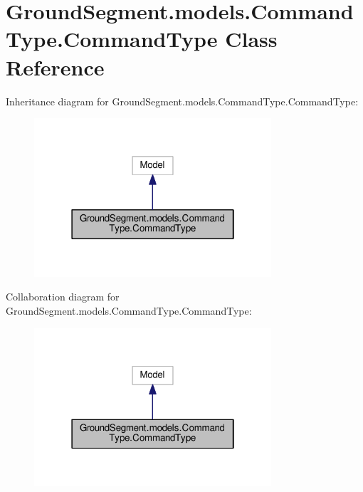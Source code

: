 \hypertarget{class_ground_segment_1_1models_1_1_command_type_1_1_command_type}{}\section{Ground\+Segment.\+models.\+Command\+Type.\+Command\+Type Class Reference}
\label{class_ground_segment_1_1models_1_1_command_type_1_1_command_type}


Inheritance diagram for Ground\+Segment.\+models.\+Command\+Type.\+Command\+Type\+:\nopagebreak
\begin{figure}[H]
\begin{center}
\leavevmode
\includegraphics[width=250pt]{class_ground_segment_1_1models_1_1_command_type_1_1_command_type__inherit__graph}
\end{center}
\end{figure}


Collaboration diagram for Ground\+Segment.\+models.\+Command\+Type.\+Command\+Type\+:\nopagebreak
\begin{figure}[H]
\begin{center}
\leavevmode
\includegraphics[width=250pt]{class_ground_segment_1_1models_1_1_command_type_1_1_command_type__coll__graph}
\end{center}
\end{figure}
